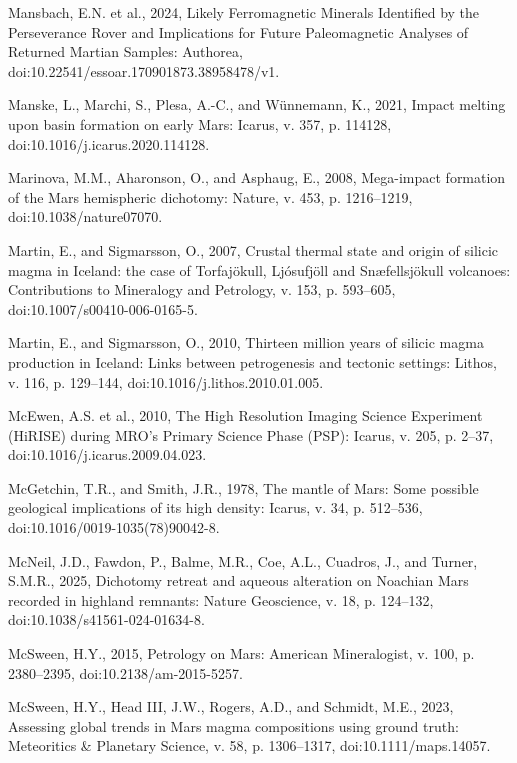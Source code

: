 \documentclass[11pt]{article}
\begin{document}
\begin{thebibliography}{99}
 Mansbach, E.N. et al., 2024, Likely Ferromagnetic Minerals Identified by the Perseverance Rover and Implications for Future Paleomagnetic Analyses of Returned Martian Samples: Authorea, doi:10.22541/essoar.170901873.38958478/v1.

 Manske, L., Marchi, S., Plesa, A.-C., and Wünnemann, K., 2021, Impact melting upon basin formation on early Mars: Icarus, v. 357, p. 114128, doi:10.1016/j.icarus.2020.114128.

 Marinova, M.M., Aharonson, O., and Asphaug, E., 2008, Mega-impact formation of the Mars hemispheric dichotomy: Nature, v. 453, p. 1216--1219, doi:10.1038/nature07070.

 Martin, E., and Sigmarsson, O., 2007, Crustal thermal state and origin of silicic magma in Iceland: the case of Torfajökull, Ljósufjöll and Snæfellsjökull volcanoes: Contributions to Mineralogy and Petrology, v. 153, p. 593--605, doi:10.1007/s00410-006-0165-5.

 Martin, E., and Sigmarsson, O., 2010, Thirteen million years of silicic magma production in Iceland: Links between petrogenesis and tectonic settings: Lithos, v. 116, p. 129--144, doi:10.1016/j.lithos.2010.01.005.

 McEwen, A.S. et al., 2010, The High Resolution Imaging Science Experiment (HiRISE) during MRO's Primary Science Phase (PSP): Icarus, v. 205, p. 2--37, doi:10.1016/j.icarus.2009.04.023.

 McGetchin, T.R., and Smith, J.R., 1978, The mantle of Mars: Some possible geological implications of its high density: Icarus, v. 34, p. 512--536, doi:10.1016/0019-1035(78)90042-8.

 McNeil, J.D., Fawdon, P., Balme, M.R., Coe, A.L., Cuadros, J., and Turner, S.M.R., 2025, Dichotomy retreat and aqueous alteration on Noachian Mars recorded in highland remnants: Nature Geoscience, v. 18, p. 124--132, doi:10.1038/s41561-024-01634-8.

 McSween, H.Y., 2015, Petrology on Mars: American Mineralogist, v. 100, p. 2380--2395, doi:10.2138/am-2015-5257.

 McSween, H.Y., Head III, J.W., Rogers, A.D., and Schmidt, M.E., 2023, Assessing global trends in Mars magma compositions using ground truth: Meteoritics \& Planetary Science, v. 58, p. 1306--1317, doi:10.1111/maps.14057.


\end{thebibliography}
\end{document}
